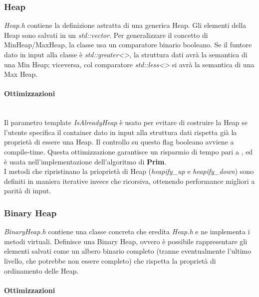 \subsubsection{Heap}

\textit{Heap.h} contiene la definizione astratta di una generica Heap.
Gli elementi della Heap sono salvati in un \textit{std::vector}.
Per generalizzare il concetto di MinHeap/MaxHeap, la classe usa un comparatore binario booleano. Se il funtore dato in input alla classe è
\textit{std::greater<>}, la struttura dati avrà la semantica di una Min Heap; viceversa, col comparatore \textit{std::less<>} si avrà la semantica di una Max Heap.

\paragraph{Ottimizzazioni}\mbox{} \\

\noindent Il parametro template \textit{IsAlreadyHeap} è usato per evitare di costruire la Heap se l'utente specifica il container dato in input alla struttura dati rispetta già la proprietà di essere una Heap. Il controllo su questo flag booleano avviene a compile-time. Questa ottimizzazione garantisce un risparmio di tempo pari a \complexityN{}, ed è usata nell'implementazione dell'algoritmo di \textbf{Prim}. \\

\noindent I metodi che ripristinano la prioprietà di Heap (\textit{heapify\_up} e \textit{heapify\_down}) sono definiti in maniera iterative invece che ricorsiva, ottenendo performance migliori a parità di input.

\subsubsection{Binary Heap}

\textit{BinaryHeap.h} contiene una classe concreta che eredita \textit{Heap.h} e ne implementa i metodi virtuali. Definisce una Binary Heap, ovvero è possibile rappresentare gli elementi salvati come un albero binario completo (tranne eventualmente l'ultimo livello, che potrebbe non essere completo) che rispetta la proprietà di ordinamento delle Heap.

\paragraph{Ottimizzazioni}\mbox{} \\


